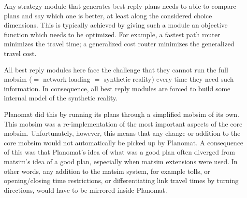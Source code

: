 \begin{compactitem}

\item Any strategy module that generates best reply plans needs to able to compare plans and say which one is better, at least along the considered choice dimensions. This is typically achieved by giving such a module an objective function which needs to be optimized. For example, a fastest path router minimizes the travel time; a generalized cost router minimizes the generalized travel cost.

All best reply modules here face the challenge that they cannot run the full \gls{mobsim} ($=$ network loading $=$ synthetic reality) every time they need such information. In consequence, all best reply modules are forced to build some internal model of the synthetic reality.  

Planomat did this by running its plans through a simplified \gls{mobsim} of its own. This \gls{mobsim} was a re-implementation of the most important aspects of the core \gls{mobsim}.
%
%
Unfortunately, however, this means that any change or addition to the core \gls{mobsim} would not automatically be picked up by Planomat.
%
A consequence of this was that Planomat's idea of what was a good plan often diverged from \gls{matsim}'s idea of a good plan, especially when \gls{matsim} extensions were used.
%
In other words, any addition to the \gls{matsim} system, for example tolls, or opening/closing time restrictions, or differentiating link travel times by turning directions, would have to be mirrored inside Planomat.
%


\end{compactitem}

